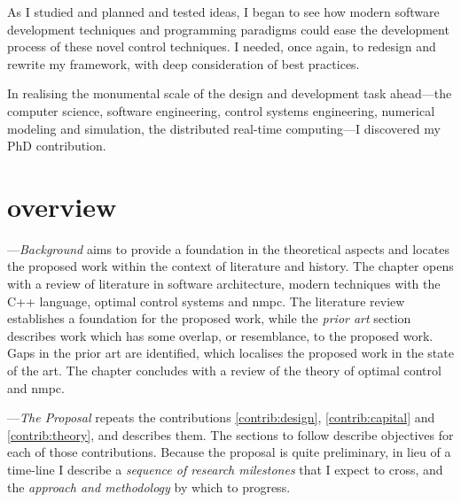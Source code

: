 As I studied and planned and tested ideas, I began to see how modern software
development techniques and programming paradigms could ease the development
process of these novel control techniques. I needed, once again, to redesign and
rewrite my framework, with deep consideration of best practices.

In realising the monumental scale of the design and development task ahead—the
computer science, software engineering, control systems engineering, numerical
modeling and simulation, the distributed real-time computing—I discovered my PhD
contribution.


\section[Overview]{overview}


—\emph{Background} aims to provide a foundation in the
theoretical aspects and locates the proposed work within the context of
literature and history. The chapter opens with a review of literature in
software architecture, modern techniques with the C++ language, optimal control
systems and \ac{nmpc}. The literature review establishes a foundation for the
proposed work, while the \emph{prior art} section describes work which has some
overlap, or resemblance, to the proposed work. Gaps in the prior art are
identified, which localises the proposed work in the state of the art. The
chapter concludes with a review of the theory of optimal control and
\ac{nmpc}.

—\emph{The Proposal} repeats the contributions
\ref{contrib:design}, \ref{contrib:capital} and \ref{contrib:theory}, and
describes them. The sections to follow describe objectives for each of those
contributions. Because the proposal is quite preliminary, in lieu of a time-line
I describe a \emph{sequence of research milestones} that I expect to cross, and
the \emph{approach and methodology} by which to progress.

